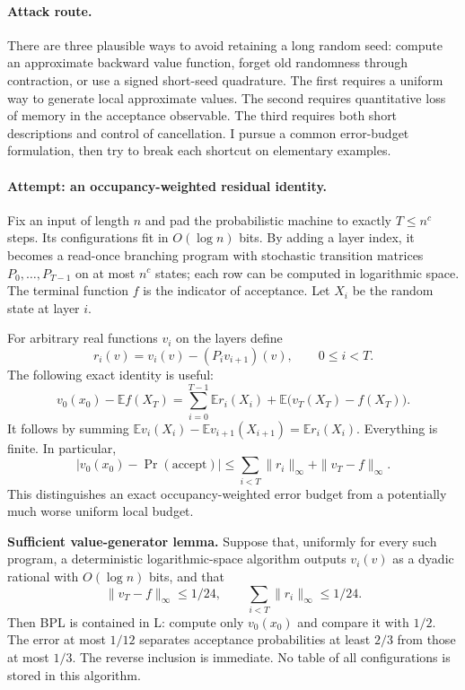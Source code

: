 \documentclass[11pt,a4paper]{article}
\newcommand{\E}{\mathbb{E}}
\numberwithin{equation}{section}
\begin{document}
\paragraph{Attack route.}
There are three plausible ways to avoid retaining a long random seed:
compute an approximate backward value function, forget old randomness
through contraction, or use a signed short-seed quadrature. The first
requires a uniform way to generate local approximate values. The second
requires quantitative loss of memory in the acceptance observable. The
third requires both short descriptions and control of cancellation.
I pursue a common error-budget formulation, then try to break each
shortcut on elementary examples.

\paragraph{Attempt: an occupancy-weighted residual identity.}
Fix an input of length $n$ and pad the probabilistic machine to exactly
$T\le n^c$ steps. Its configurations fit in $O(\log n)$ bits. By adding
a layer index, it becomes a read-once branching program with stochastic
transition matrices $P_0,\ldots,P_{T-1}$ on at most $n^c$ states; each
row can be computed in logarithmic space. The terminal function $f$ is
the indicator of acceptance. Let $X_i$ be the random state at layer $i$.

For arbitrary real functions $v_i$ on the layers define
\[
 r_i(v)=v_i(v)-(P_iv_{i+1})(v),\qquad 0\le i<T.
\]
The following exact identity is useful:
\begin{equation}\label{statement:residual}
 v_0(x_0)-\E f(X_T)
 =\sum_{i=0}^{T-1}\E r_i(X_i)
       +\E\bigl(v_T(X_T)-f(X_T)\bigr).
\end{equation}
It follows by summing
$\E v_i(X_i)-\E v_{i+1}(X_{i+1})=\E r_i(X_i)$.
Everything is finite. In particular,
\begin{equation}\label{statement:residual-bound}
 |v_0(x_0)-\Pr(\mathrm{accept})|
 \le\sum_{i<T}\|r_i\|_\infty+\|v_T-f\|_\infty.
\end{equation}
This distinguishes an exact occupancy-weighted error budget from a
potentially much worse uniform local budget.

\textbf{Sufficient value-generator lemma.} Suppose that, uniformly for
every such program, a deterministic logarithmic-space algorithm outputs
$v_i(v)$ as a dyadic rational with $O(\log n)$ bits, and that
\[
 \|v_T-f\|_\infty\le1/24,
 \qquad\sum_{i<T}\|r_i\|_\infty\le1/24.
\]
Then BPL is contained in L: compute only $v_0(x_0)$ and compare it with
$1/2$. The error at most $1/12$ separates acceptance probabilities at
least $2/3$ from those at most $1/3$. The reverse inclusion is immediate.
No table of all configurations is stored in this algorithm.
\end{document}

